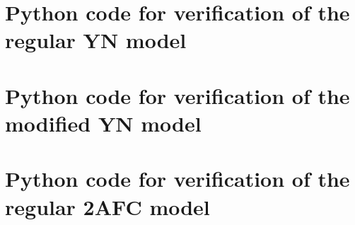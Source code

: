 \documentclass[man]{apa6}
\begin{document}


\appendix
\label{app:a}
\section{Python code for verification of the regular YN model}

\appendix
\label{app:b}
\section{Python code for verification of the modified YN model}

\appendix
\label{app:c}
\section{Python code for verification of the regular 2AFC model}

\end{document}
